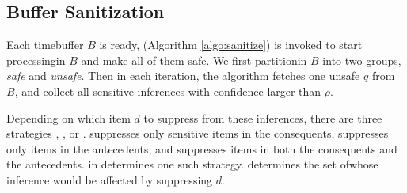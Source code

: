 \subsection{Buffer Sanitization}
\label{sec:sanitize}

Each time\qid buffer $B$ is ready, \SanitizeBuffer (Algorithm \ref{algo:sanitize}) 
is invoked to start processing\qids in $B$ and make all of them safe.
We first partition\qids in $B$ into two groups, {\em safe} and {\em unsafe}.
Then in each iteration, the algorithm fetches one unsafe $q$ from $B$,
and collect all sensitive inferences with confidence larger than $\rho$.

Depending on which item $d$ to suppress from these inferences, there are three strategies \PartialR, \PartialL, or \PartialALL.
\PartialR suppresses only sensitive items in the consequents, 
\PartialL suppresses only items in the antecedents,
and \PartialALL suppresses items in both the consequents and the antecedents.
\SuppressionPolicy in \SanitizeBuffer determines one such strategy. 
\UpdateBuffer determines the set of\qids whose inference would 
be affected by suppressing $d$.
